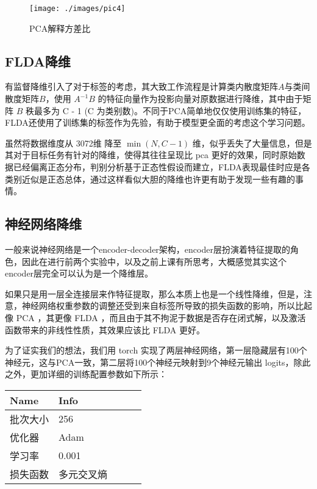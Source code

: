 \documentclass[fleqn]{Paquetes/RevDigMatEduInt}
\begin{document}
\begin{figure}[h]
	\centering
	\texttt{[image: ./images/pic4]}
	\caption{PCA解释方差比}
\end{figure}


\subsection{FLDA降维}
有监督降维引入了对于标签的考虑，其大致工作流程是计算类内散度矩阵$A$与类间散度矩阵$B$，使用 $A^{-1}B$ 的特征向量作为投影向量对原数据进行降维，其中由于矩阵 $B$ 秩最多为 C - 1 (C 为类别数)。不同于PCA简单地仅仅使用训练集的特征，FLDA还使用了训练集的标签作为先验，有助于模型更全面的考虑这个学习问题。

虽然将数据维度从 3072维 降至 $\min(N,C - 1)$ 维，似乎丢失了大量信息，但是其对于目标任务有针对的降维，使得其往往呈现比 pca 更好的效果，同时原始数据已经偏离正态分布，判别分析基于正态性假设而建立，FLDA表现最佳时应是各类别近似是正态总体，通过这样看似大胆的降维也许更有助于发现一些有趣的事情。


\subsection{神经网络降维}
一般来说神经网络是一个encoder-decoder架构，encoder层扮演着特征提取的角色，因此在进行前两个实验中，以及之前上课有所思考，大概感觉其实这个encoder层完全可以认为是一个降维层。

如果只是用一层全连接层来作特征提取，那么本质上也是一个线性降维，但是，注意，神经网络权重参数的调整还受到来自标签所导致的损失函数的影响，所以比起像 PCA ，其更像 FLDA ，而且由于其不拘泥于数据是否存在闭式解，以及激活函数带来的非线性性质，其效果应该比 FLDA 更好。

为了证实我们的想法，我们用 torch 实现了两层神经网络，第一层隐藏层有100个神经元，这与PCA一致，第二层将100个神经元映射到9个神经元输出 logits，除此之外，更加详细的训练配置参数如下所示：

\begin{table}[ht!!!]
	\centering
	\begin{minipage}{0.5\textwidth}
		\centering
		\begin{tabular}{*5l}    \toprule
			Name & Info \\ \midrule
			批次大小    & 256  \\ 
			优化器  & Adam\\ 
			学习率 & 0.001\\ 
			损失函数  & 多元交叉熵 \\  \bottomrule
		\end{tabular}
		\label{tabla:nombre}
	\end{minipage}
\end{table}
\end{document}

